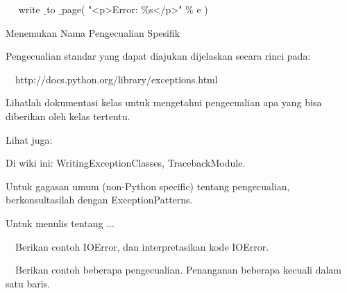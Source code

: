 \documentclass[a4paper,12pt]{report}
\begin{document}
{\fontsize{10pt}{10pt}\selectfont ~~ write $  \_  $to $  \_  $page( "<p>Error:  $  \%  $s</p>"  $  \%  $ e )} \par
\vspace{12pt}
\noindent 
{\fontsize{14pt}{14pt}\selectfont Menemukan Nama Pengecualian Spesifik \\} \par
\noindent 
\vspace{14pt}
\noindent 
{\fontsize{14pt}{14pt}\selectfont Pengecualian standar yang dapat diajukan dijelaskan secara rinci pada: \\} \par
\noindent 
\vspace{14pt}
\noindent 
{\fontsize{14pt}{14pt}\selectfont  $  $ $  $ $  $ $  $http://docs.python.org/library/exceptions.html \\} \par
\noindent 
\vspace{14pt}
\noindent 
{\fontsize{14pt}{14pt}\selectfont Lihatlah dokumentasi kelas untuk mengetahui pengecualian apa yang bisa diberikan oleh kelas tertentu. \\} \par
\noindent 
\vspace{14pt}
\noindent 
{\fontsize{14pt}{14pt}\selectfont Lihat juga: \\} \par
\noindent 
\vspace{14pt}
\noindent 
{\fontsize{14pt}{14pt}\selectfont Di wiki ini: WritingExceptionClasses, TracebackModule. \\} \par
\noindent 
\vspace{14pt}
\noindent 
{\fontsize{14pt}{14pt}\selectfont Untuk gagasan umum (non-Python specific) tentang pengecualian, berkonsultasilah dengan ExceptionPatterns. \\} \par
\noindent 
\vspace{14pt}
\noindent 
{\fontsize{14pt}{14pt}\selectfont Untuk menulis tentang ... \\} \par
\noindent 
\vspace{14pt}
\noindent 
{\fontsize{14pt}{14pt}\selectfont  $  $ $  $ $  $ $  $Berikan contoh IOError, dan interpretasikan kode IOError. \\} \par
\noindent 
{\fontsize{14pt}{14pt}\selectfont  $  $ $  $ $  $ $  $Berikan contoh beberapa pengecualian. Penanganan beberapa kecuali dalam satu baris. \\} \par
\end{document}
